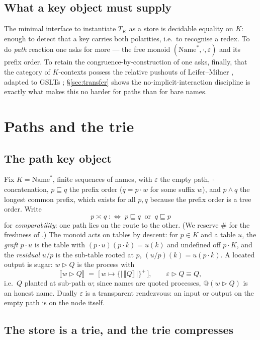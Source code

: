 \documentclass[11pt]{article}
\makeatletter
\theoremstyle{plain}
\theoremstyle{definition}
\newcommand{\den}[1]{\llbracket #1 \rrbracket}
\newcommand{\Name}{\mathrm{Name}}
\newcommand{\comp}{\mathrel{\asymp}}            %
\newcommand{\loc}{\mathrel{\rhd}}               %
\newcommand{\quo}{@}
\newcommand{\eps}{\varepsilon}
\makeatother
\begin{document}
\subsection{What a key object must supply}

The minimal interface to instantiate $T_{K}$ as a store is decidable equality on $K$: enough to
detect that a key carries both polarities, i.e.\ to recognise a redex. To do \emph{path} reaction one
asks for more --- the free monoid $(\Name^{\ast},\cdot,\eps)$ and its prefix order. To retain the
congruence-by-construction of \cite{KnotRho} one asks, finally, that the category of $K$-contexts
possess the relative pushouts of Leifer--Milner \cite{LM00,Sewell02}, adapted to GSLTs \cite{GSLT};
\S\ref{sec:transfer} shows the no-implicit-interaction discipline is exactly what makes this
no harder for paths than for bare names.

\section{Paths and the trie}\label{sec:trie}

\subsection{The path key object}

Fix $K=\Name^{\ast}$, finite sequences of names, with $\eps$ the empty path, $\cdot$ concatenation,
$p\sqsubseteq q$ the prefix order ($q=p\cdot w$ for some suffix $w$), and $p\wedge q$ the
longest common prefix, which exists for all $p,q$ because the prefix order is a tree order. Write
\[
  p\comp q \;:\Longleftrightarrow\; p\sqsubseteq q \ \text{ or }\ q\sqsubseteq p
\]
for \emph{comparability}: one path lies on the route to the other. (We reserve $\#$ for the freshness
of \cite{KnotRho}.) The monoid acts on tables by descent: for $p\in K$ and a table $u$, the
\emph{graft} $p\cdot u$ is the table with $(p\cdot u)(p\cdot k)=u(k)$ and undefined off
$p\cdot K$, and the \emph{residual} $u/p$ is the sub-table rooted at $p$, $(u/p)(k)=u(p\cdot k)$. A
located output is sugar: $w\loc Q$ is the process with
\[
  \den{w\loc Q}\;=\;\bigl[\,w\mapsto\{\!|\,\den Q\,|\!\}^{+}\,\bigr],
  \qquad \eps\loc Q\equiv Q,
\]
i.e.\ $Q$ planted at sub-path $w$; since names are quoted processes, $\quo(w\loc Q)$ is an honest
name. Dually $\eps$ is a transparent rendezvous: an input or output on the empty path is on the node
itself.

\subsection{The store is a trie, and the trie compresses}
\end{document}
